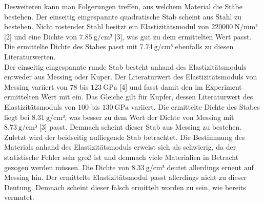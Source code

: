 Desweiteren kann man Folgerungen treffen, aus welchem Material die 
Stäbe bestehen. Der einseitig eingespannte quadratische Stab scheint aus
Stahl zu bestehen. Nicht rostender Stahl besitzt ein Elastizitätsmodul von 
$\SI{220000}{\newton\per\milli\meter²}$ [2] und eine Dichte von 
$\SI{7.85}{\gram\per\centi\meter³}$ [3], was gut zu dem ermittelten 
Wert passt. Die ermittelte Dichte des Stabes passt mit 
$\SI{7.74}{\gram\per\centi\meter³}$ ebenfalls zu diesen Literaturwerten.
\\
Der einseitig eingespannte runde Stab besteht anhand des Elastizitätsmoduls
entweder aus Messing oder Kuper. Der Literaturwert des Elastizitätsmoduls
von Messing variiert von $\num{78}$ bis $ \SI{123}{\giga\pascal}$ [4] und fasst
damit den im Experiment ermittelten Wert mit ein. Das Gleiche gilt für 
Kupfer, dessen Literaturwert des Elastizitätsmoduls von
$\num{100}$ bis $\SI{130}{\giga\pascal}$ variiert. Die ermittelte Dichte des 
Stabes liegt bei $\SI{8.31}{\gram\per\centi\meter³}$, was besser zu dem Wert 
der Dichte von Messing mit $\SI{8.73}{\gram\per\centi\meter³}$ [3] passt. 
Demnach scheint dieser Stab aus Messing zu bestehen. 
\\
Zuletzt wird der beidseitig aufliegende Stab betrachtet. Die Bestimmung 
des Materials anhand des Elastizitätsmoduls erweist sich als schwierig, 
da der statistische Fehler sehr groß ist und demnach viele Materialien in
Betracht gezogen werden müssen. Die Dichte von $\SI{8.33}{\gram\per\centi\meter³}$
deutet allerdings erneut auf Messing hin. Der ermittelte Elastizitätsmodul
passt allerdings nicht zu dieser Deutung. Demnach scheint dieser falsch 
ermittelt worden zu sein, wie bereits vermutet. 